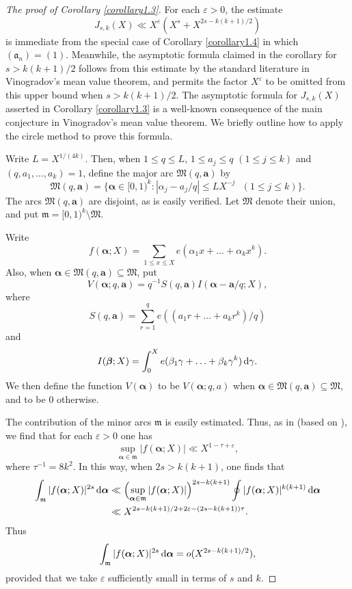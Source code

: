 \documentclass[12pt,reqno]{amsart}
\theoremstyle{definition}
\theoremstyle{remark}
\numberwithin{equation}{section}
\def\bfa{{\mathbf a}}
\def\gra{{\mathfrak a}}\def\grA{{\mathfrak A}}\def\bfgra{{\boldsymbol \gra}}
\def\grm{{\mathfrak m}}\def\grM{{\mathfrak M}}
\def\alp{{\alpha}} \def\bfalp{{\boldsymbol \alpha}}
\def\bet{{\beta}}  \def\bfbet{{\boldsymbol \beta}}
\def\gam{{\gamma}} \def\Gam{{\Gamma}}
\def\eps{\varepsilon}
\def\le{\leqslant} \def\ge{\geqslant} \def\pleq{\preccurlyeq} \def\ple{\prec}
\def\d{{\,{\rm d}}}
\begin{document}
\begin{proof}[The proof of Corollary \ref{corollary1.3}] For each $\eps>0$, the estimate
$$J_{s,k}(X)\ll X^\eps (X^s+X^{2s-k(k+1)/2})$$
is immediate from the special case of Corollary \ref{corollary1.4} in which $(\gra_n)=(1)$. 
Meanwhile, the asymptotic formula claimed in the corollary for $s>k(k+1)/2$ follows from 
this estimate by the standard literature in Vinogradov's mean value theorem, and permits 
the factor $X^\eps$ to be omitted from this upper bound when $s>k(k+1)/2$. The 
asymptotic formula for $J_{s,k}(X)$ asserted in Corollary \ref{corollary1.3} is a well-known 
consequence of the main conjecture in Vinogradov's mean value theorem. We briefly outline 
how to apply the circle method to prove this formula.\par

Write $L=X^{1/(4k)}$. Then, when $1\le q\le L$, $1\le a_j\le q$ $(1\le j\le k)$ and 
$(q,a_1,\ldots ,a_k)=1$, define the major arc $\grM(q,\bfa)$ by
$$\grM(q,\bfa)=\{ \bfalp \in [0,1)^k: \text{$|\alp_j-a_j/q|\le LX^{-j}$ $(1\le j\le k)$}\}.$$
The arcs $\grM(q,\bfa)$ are disjoint, as is easily verified. Let $\grM$ denote their union, and 
put $\grm=[0,1)^k\setminus \grM$.\par

Write
$$f(\bfalp;X)=\sum_{1\le x\le X}e(\alp_1x+\ldots +\alp_kx^k).$$
Also, when $\bfalp\in \grM(q,\bfa)\subseteq \grM$, put
$$V(\bfalp;q,\bfa)=q^{-1}S(q,\bfa)I(\bfalp-\bfa/q;X),$$
where
$$S(q,\bfa)=\sum_{r=1}^qe((a_1r+\ldots +a_kr^k)/q)$$
and
$$I(\bfbet;X)=\int_0^Xe(\bet_1\gam+\ldots +\bet_k\gam^k)\d\gam .$$
We then define the function $V(\bfalp)$ to be $V(\bfalp;q,a)$ when $\bfalp\in \grM(q,\bfa)
\subseteq \grM$, and to be $0$ otherwise.\par

The contribution of the minor arcs $\grm$ is easily estimated. Thus, as in 
\cite[equation (7.1)]{Woo2017a} (based on \cite[\S9]{Woo2012}), we find that for each 
$\eps>0$ one has
$$\sup_{\bfalp\in \grm}|f(\bfalp;X)|\ll X^{1-\tau+\eps},$$
where $\tau^{-1}=8k^2$. In this way, when $2s>k(k+1)$, one finds that
\begin{align*}
\int_\grm|f(\bfalp;X)|^{2s}\d\bfalp &\ll \Bigl( \sup_{\bfalp\in \grm}|f(\bfalp;X)|\Bigr)^{
2s-k(k+1)}\oint |f(\bfalp;X)|^{k(k+1)}\d\bfalp \\
&\ll X^{2s-k(k+1)/2+2\eps -(2s-k(k+1))\tau}.
\end{align*}
Thus
\begin{equation}\label{12.8}
\int_\grm |f(\bfalp;X)|^{2s}\d\bfalp =o(X^{2s-k(k+1)/2}),
\end{equation}
provided that we take $\eps$ sufficiently small in terms of $s$ and $k$.\par


\end{proof}
\end{document}
